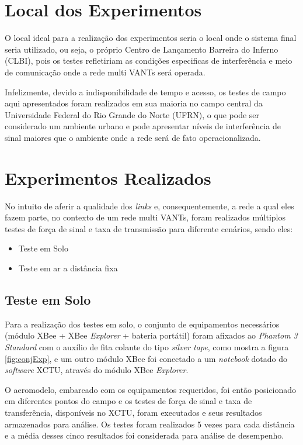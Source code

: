 \section{Local dos Experimentos}

O local ideal para a realização dos experimentos seria o local onde o sistema final seria utilizado, ou seja, o próprio Centro de Lançamento Barreira do Inferno (CLBI), pois os testes refletiriam as condições especificas de interferência e meio de comunicação onde a rede multi VANTs será operada.

Infelizmente, devido a indisponibilidade de tempo e acesso, os testes de campo aqui apresentados foram realizados em sua maioria no campo central da Universidade Federal do Rio Grande do Norte (UFRN), o que pode ser considerado um ambiente urbano e pode apresentar níveis de interferência de sinal maiores que o ambiente onde a rede será de fato operacionalizada. 

\section{Experimentos Realizados}

No intuito de aferir a qualidade dos \emph{links} e, consequentemente, a rede a qual eles fazem parte, no contexto de um rede multi VANTs, foram realizados múltiplos testes de força de sinal e taxa de transmissão para diferente cenários, sendo eles:

\begin{itemize}
\item Teste em Solo
\item Teste em ar a distância fixa
\end{itemize} 

\subsection{Teste em Solo}

Para a realização dos testes em solo, o conjunto de equipamentos necessários (módulo XBee + XBee \emph{Explorer} + bateria portátil) foram afixados ao \emph{Phantom 3 Standard} com o auxílio de fita colante do tipo \emph{silver tape}, como mostra a figura \ref{fig:conjExp}, e um outro módulo XBee foi conectado a um \emph{notebook} dotado do \emph{software} XCTU, através do módulo XBee \emph{Explorer}.

O aeromodelo, embarcado com os equipamentos requeridos, foi então posicionado em diferentes pontos do campo e os testes de força de sinal e taxa de transferência, disponíveis no XCTU, foram executados e seus resultados armazenados para análise. Os testes foram realizados 5 vezes para cada distância e a média desses cinco resultados foi considerada para análise de desempenho. 
 
